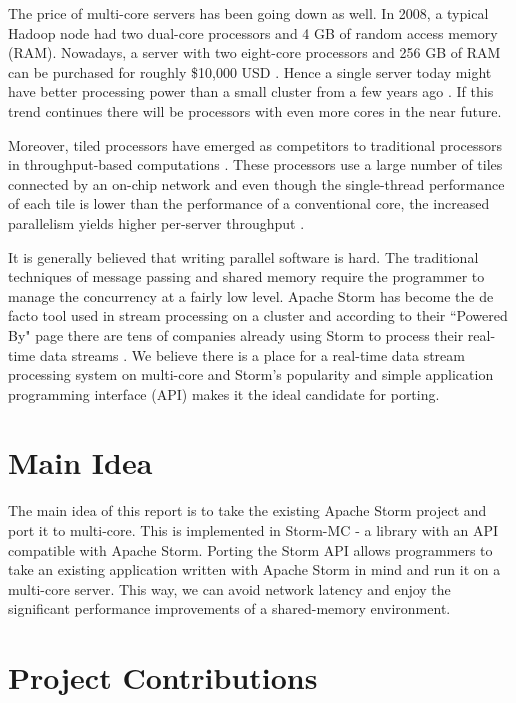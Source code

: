 \documentclass[bsc,logo,frontabs,twoside,singlespacing,normalheadings,parskip]{infthesis}\usepackage[]{graphicx}\usepackage[]{color}
\begin{document}
The price of multi-core servers has been going down as well. In 2008, a typical Hadoop node had two dual-core processors and 4 GB of random access memory (RAM). Nowadays, a server with two eight-core processors and 256 GB of RAM can be purchased for roughly \$10,000 USD \citep{Kumar:2013:HSD:2536274.2536314}. Hence a single server today might have better processing power than a small cluster from a few years ago \citep{Kumar:2013:HSD:2536274.2536314}. If this trend continues there will be processors with even more cores in the near future.

Moreover, tiled processors have emerged as competitors to traditional processors in throughput-based computations \cite{Tilera}. These processors use a large number of tiles connected by an on-chip network and even though the single-thread performance of each tile is lower than the performance of a conventional core, the increased parallelism yields higher per-server throughput \cite{DBLP:conf/isca/Lotfi-KamranGFVKPAJIOF12}.

It is generally believed that writing parallel software is hard. The traditional techniques of message passing and shared memory require the programmer to manage the concurrency at a fairly low level. Apache Storm has become the de facto tool used in stream processing on a cluster and according to their ``Powered By" page there are tens of companies already using Storm to process their real-time data streams \cite{PoweredBy}. We believe there is a place for a real-time data stream processing system on multi-core and Storm's popularity and simple application programming interface (API) makes it the ideal candidate for porting.

\section{Main Idea}

The main idea of this report is to take the existing Apache Storm project and port it to multi-core. This is implemented in Storm-MC - a library with an API compatible with Apache Storm. Porting the Storm API allows programmers to take an existing application written with Apache Storm in mind and run it on a multi-core server. This way, we can avoid network latency and enjoy the significant performance improvements of a shared-memory environment.

\section{Project Contributions}
\end{document}
